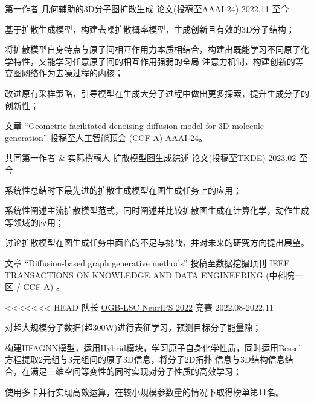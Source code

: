\begin{cventries}
  
\cventry
{第一作者} %
{几何辅助的3D分子图扩散生成} %
{论文(投稿至AAAI-24)} %
{2022.11-至今} %
{
  \begin{cvitems} 
    \item {基于扩散生成模型，构建去噪扩散概率模型，生成创新且有效的3D分子结构；}
    \item {将扩散模型自身特点与原子间相互作用力本质相结合，构建出既能学习不同原子化学特性，又能学习任意原子间的相互作用强弱的全局
    注意力机制，构建创新的等变图网络作为去噪过程的内核；}
    \item {改进原有采样策略，引导模型在生成大分子过程中做出更多探索，提升生成分子的创新性；}
    \item {文章 “Geometric-facilitated denoising diffusion model for 3D molecule generation” 投稿至人工智能顶会 (CCF-A) AAAI-24。}
  \end{cvitems}
}

\cventry
{共同第一作者 \& 实际撰稿人} %
{扩散模型图生成综述} %
{论文(投稿至TKDE)} %
{2023.02-至今} %
{
  \begin{cvitems} 
    \item {系统性总结时下最先进的扩散生成模型在图生成任务上的应用；}
    \item {系统性阐述主流扩散模型范式，同时阐述并比较扩散图生成在计算化学，动作生成等领域的应用；}
    \item {讨论扩散模型在图生成任务中面临的不足与挑战，并对未来的研究方向提出展望。}
    \item {文章 “Diffusion-based graph generative methods” 投稿至数据挖掘顶刊 IEEE TRANSACTIONS ON KNOWLEDGE AND DATA ENGINEERING (中科院一区 / CCF-A) 。}
\end{cvitems}
}

\cventry
<<<<<<< HEAD
{队长} %
{\href{https://ogb.stanford.edu/neurips2022/results/}{OGB-LSC NeurlPS 2022}} %
{竞赛} %
{2022.08-2022.11} %
{
  \begin{cvitems} %
    \item {对超大规模分子数据(超300W)进行表征学习，预测目标分子能量隙；}
    \item {构建HFAGNN模型，运用Hybrid模块，学习原子自身化学性质，同时运用Bessel方程提取2元组与3元组间的原子3D信息，将分子2D拓扑
    信息与3D结构信息结合，在满足三维空间等变性的同时实现对分子性质的高效学习；}
    \item {使用多卡并行实现高效运算，在较小规模参数量的情况下取得榜单第11名。}
  \end{cvitems}
}


\end{cventries}
